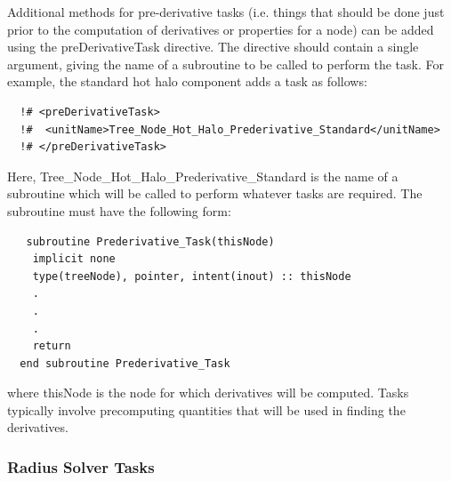 Additional methods for pre-derivative tasks (i.e. things that should be done just prior to the computation of derivatives or properties for a node) can be added using the {\normalfont \ttfamily preDerivativeTask} directive. The directive should contain a single argument, giving the name of a subroutine to be called to perform the task. For example, the standard hot halo component adds a task as follows:
\begin{verbatim}
  !# <preDerivativeTask>
  !#  <unitName>Tree_Node_Hot_Halo_Prederivative_Standard</unitName>
  !# </preDerivativeTask>
\end{verbatim}
Here, {\normalfont \ttfamily Tree\_Node\_Hot\_Halo\_Prederivative\_Standard} is the name of a subroutine which will be called to perform whatever tasks are required. The subroutine must have the following form:
\begin{verbatim}
   subroutine Prederivative_Task(thisNode)
    implicit none
    type(treeNode), pointer, intent(inout) :: thisNode
    .
    .
    .
    return
  end subroutine Prederivative_Task
\end{verbatim}
where {\normalfont \ttfamily thisNode} is the node for which derivatives will be computed. Tasks typically involve precomputing quantities that will be used in finding the derivatives.

\subsubsection{Radius Solver Tasks}\label{sec:radius_solver}

